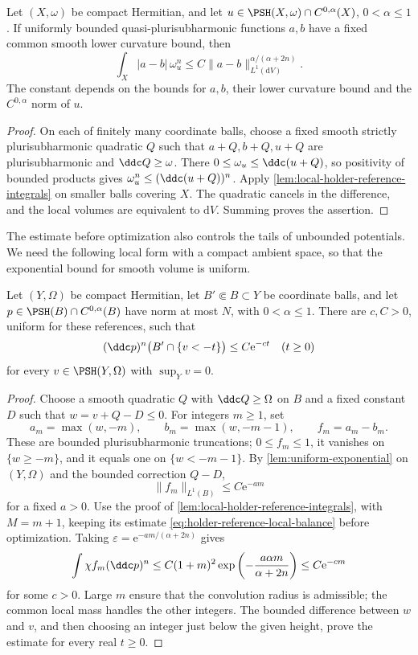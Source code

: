 \begin{corollary}\label{cor:holder-reference-weighted-modulus}
Let $(X,\omega)$ be compact Hermitian, and let $u\in\PSH(X,\omega)\cap C^{0,\alpha}(X)$, $0<\alpha\leq1$. If uniformly bounded quasi-plurisubharmonic functions $a,b$ have a fixed common smooth lower curvature bound, then
\[
 \int_X|a-b|\,\omega_u^n
 \leq C\|a-b\|_{L^1(\mathrm dV)}^{\alpha/(\alpha+2n)}.
\]
The constant depends on the bounds for $a,b$, their lower curvature bound and the $C^{0,\alpha}$ norm of $u$.
\end{corollary}
\begin{proof}
On each of finitely many coordinate balls, choose a fixed smooth strictly plurisubharmonic quadratic $Q$ such that $a+Q,b+Q,u+Q$ are plurisubharmonic and $\ddc Q\geq\omega$. There
$0\leq\omega_u\leq\ddc(u+Q)$, so positivity of bounded products gives $\omega_u^n\leq(\ddc(u+Q))^n$. Apply \cref{lem:local-holder-reference-integrals} on smaller balls covering $X$. The quadratic cancels in the difference, and the local volumes are equivalent to $\mathrm dV$. Summing proves the assertion.
\end{proof}

The estimate before optimization also controls the tails of unbounded potentials. We need the following local form with a compact ambient space, so that the exponential bound for smooth volume is uniform.

\begin{lemma}\label{lem:local-holder-exponential-tails}
Let $(Y,\Omega)$ be compact Hermitian, let $B'\Subset B\subset Y$ be coordinate balls, and let $p\in\PSH(B)\cap C^{0,\alpha}(B)$ have norm at most $N$, with $0<\alpha\leq1$. There are $c,C>0$, uniform for these references, such that
\[
 (\ddc p)^n\bigl(B'\cap\{v<-t\}\bigr)\leq C\mathrm e^{-ct}
 \quad(t\geq0)
\]
for every $v\in\PSH(Y,\Omega)$ with $\sup_Yv=0$.
\end{lemma}
\begin{proof}
Choose a smooth quadratic $Q$ with $\ddc Q\geq\Omega$ on $B$ and a fixed constant $D$ such that $w=v+Q-D\leq0$. For integers $m\geq1$, set
\[
 a_m=\max(w,-m),\qquad b_m=\max(w,-m-1),\qquad f_m=a_m-b_m.
\]
These are bounded plurisubharmonic truncations; $0\leq f_m\leq1$, it vanishes on $\{w\geq-m\}$, and it equals one on $\{w<-m-1\}$. By \cref{lem:uniform-exponential} on $(Y,\Omega)$ and the bounded correction $Q-D$,
\[
 \|f_m\|_{L^1(B)}\leq C\mathrm e^{-am}
\]
for a fixed $a>0$. Use the proof of \cref{lem:local-holder-reference-integrals}, with $M=m+1$, keeping its estimate \eqref{eq:holder-reference-local-balance} before optimization. Taking $\varepsilon=\mathrm e^{-am/(\alpha+2n)}$ gives
\[
 \int\chi f_m(\ddc p)^n
 \leq C(1+m)^2\exp\left(-\frac{a\alpha m}{\alpha+2n}\right)
 \leq C\mathrm e^{-cm}
\]
for some $c>0$. Large $m$ ensure that the convolution radius is admissible; the common local mass handles the other integers. The bounded difference between $w$ and $v$, and then choosing an integer just below the given height, prove the estimate for every real $t\geq0$.
\end{proof}
